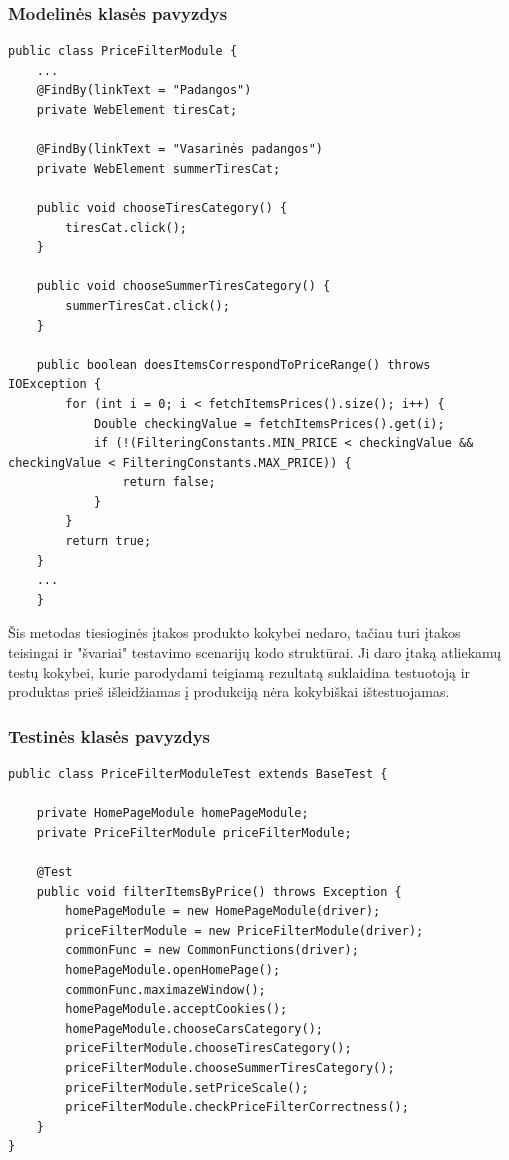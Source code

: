 \documentclass[a4paper,12pt,fleqn]{article}
\begin{document}
\newpage
\subsubsection{Modelinės klasės pavyzdys}
\begin{lstlisting}[caption={Testavimo naudojant modulius pavyzdys - modelinė klasė.}]
    public class PriceFilterModule {
    ...
    @FindBy(linkText = "Padangos")
    private WebElement tiresCat;

    @FindBy(linkText = "Vasarinės padangos")
    private WebElement summerTiresCat;

    public void chooseTiresCategory() {
        tiresCat.click();
    }

    public void chooseSummerTiresCategory() {
        summerTiresCat.click();
    }

    public boolean doesItemsCorrespondToPriceRange() throws IOException {
        for (int i = 0; i < fetchItemsPrices().size(); i++) {
            Double checkingValue = fetchItemsPrices().get(i);
            if (!(FilteringConstants.MIN_PRICE < checkingValue && checkingValue < FilteringConstants.MAX_PRICE)) {
                return false;
            }
        }
        return true;
    }
    ...
    }
\end{lstlisting}

Šis metodas tiesioginės įtakos produkto kokybei nedaro, tačiau turi įtakos teisingai ir "švariai" testavimo scenarijų kodo struktūrai. Ji daro įtaką atliekamų testų kokybei, kurie parodydami teigiamą rezultatą suklaidina testuotoją ir produktas prieš išleidžiamas į produkciją nėra kokybiškai ištestuojamas.

\newpage
\subsubsection{Testinės klasės pavyzdys}
\begin{lstlisting}[caption={Testinė klasė, kviečianti modulines klases.}]
public class PriceFilterModuleTest extends BaseTest {

    private HomePageModule homePageModule;
    private PriceFilterModule priceFilterModule;

    @Test
    public void filterItemsByPrice() throws Exception {
        homePageModule = new HomePageModule(driver);
        priceFilterModule = new PriceFilterModule(driver);
        commonFunc = new CommonFunctions(driver);
        homePageModule.openHomePage();
        commonFunc.maximazeWindow();
        homePageModule.acceptCookies();
        homePageModule.chooseCarsCategory();
        priceFilterModule.chooseTiresCategory();
        priceFilterModule.chooseSummerTiresCategory();
        priceFilterModule.setPriceScale();
        priceFilterModule.checkPriceFilterCorrectness();
    }
}
\end{lstlisting}
\end{document}
